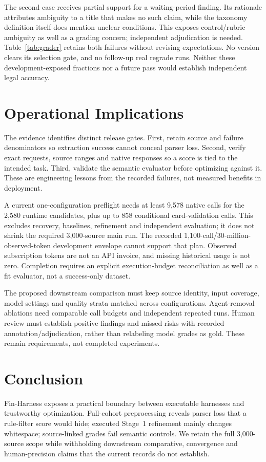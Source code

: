 \documentclass[11pt]{article}
\begin{document}
The second case receives partial support for a waiting-period finding.
Its rationale attributes ambiguity to a title that makes no such claim,
while the taxonomy definition itself does mention unclear conditions.
This exposes control/rubric ambiguity as well as a grading concern;
independent adjudication is needed. Table~\ref{tab:grader} retains both
failures without revising expectations. No version clears its selection
gate, and no follow-up real regrade runs. Neither these development-exposed
fractions nor a future pass would establish independent legal accuracy.

\section{Operational Implications}
The evidence identifies distinct release gates. First, retain source and
failure denominators so extraction success cannot conceal parser loss.
Second, verify exact requests, source ranges and native responses so a
score is tied to the intended task. Third, validate the semantic evaluator
before optimizing against it. These are engineering lessons from the
recorded failures, not measured benefits in deployment.

A current one-configuration preflight needs at least 9,578 native calls
for the 2,580 runtime candidates, plus up to 858 conditional card-validation
calls. This excludes recovery, baselines, refinement and independent
evaluation; it does not shrink the required 3,000-source main run.
The recorded 1,100-call/30-million-observed-token development envelope
cannot support that plan. Observed subscription tokens are not an API
invoice, and missing historical usage is not zero.
Completion requires an explicit execution-budget reconciliation as well
as a fit evaluator, not a success-only dataset.

The proposed downstream comparison must keep source identity, input
coverage, model settings and quality strata matched across configurations.
Agent-removal ablations need comparable call budgets and independent
repeated runs. Human review must establish positive findings and missed
risks with recorded annotation/adjudication, rather than relabeling model
grades as gold. These remain requirements, not completed experiments.

\section{Conclusion}
Fin-Harness exposes a practical boundary between executable harnesses and
trustworthy optimization. Full-cohort preprocessing reveals parser loss
that a rule-filter score would hide; executed Stage~1 refinement mainly
changes whitespace; source-linked grades fail semantic controls.
We retain the full 3,000-source scope while withholding downstream
comparative, convergence and human-precision claims that the current
records do not establish.
\end{document}
